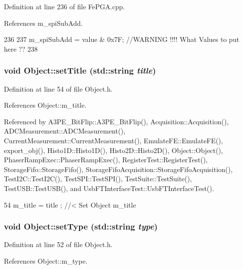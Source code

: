 Definition at line 236 of file FePGA.cpp.

References m\_\-spiSubAdd.


\begin{DoxyCode}
236                                                        {
237   m_spiSubAdd = value & 0x7F;  //WARNING !!!! What Values to put here ??
238 }
\end{DoxyCode}
\hypertarget{classObject_a89557dbbad5bcaa02652f5d7fa35d20f}{
\subsubsection[{setTitle}]{\setlength{\rightskip}{0pt plus 5cm}void Object::setTitle (std::string {\em title})}}
\label{classObject_a89557dbbad5bcaa02652f5d7fa35d20f}


Definition at line 54 of file Object.h.

References Object::m\_\-title.

Referenced by A3PE\_\-BitFlip::A3PE\_\-BitFlip(), Acquisition::Acquisition(), ADCMeasurement::ADCMeasurement(), CurrentMeasurement::CurrentMeasurement(), EmulateFE::EmulateFE(), export\_\-obj(), Histo1D::Histo1D(), Histo2D::Histo2D(), Object::Object(), PhaserRampExec::PhaserRampExec(), RegisterTest::RegisterTest(), StorageFifo::StorageFifo(), StorageFifoAcquisition::StorageFifoAcquisition(), TestI2C::TestI2C(), TestSPI::TestSPI(), TestSuite::TestSuite(), TestUSB::TestUSB(), and UsbFTInterfaceTest::UsbFTInterfaceTest().


\begin{DoxyCode}
54 { m_title = title ; } //< Set Object m_title
\end{DoxyCode}
\hypertarget{classObject_aae534cc9d982bcb9b99fd505f2e103a5}{
\subsubsection[{setType}]{\setlength{\rightskip}{0pt plus 5cm}void Object::setType (std::string {\em type})}}
\label{classObject_aae534cc9d982bcb9b99fd505f2e103a5}


Definition at line 52 of file Object.h.

References Object::m\_\-type.


